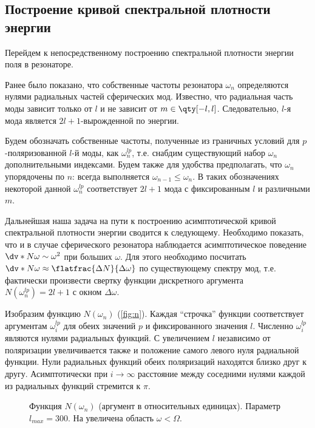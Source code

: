%
%
%
%
%
%

\subsection{Построение кривой спектральной плотности энергии}

    Перейдем к непосредственному построению спектральной плотности энергии поля в резонаторе.

    Ранее было показано, что собственные частоты резонатора $\omega_n$ определяются нулями радиальных частей сферических мод. Известно, что радиальная часть моды зависит только от $l$ и не зависит от $m \in \qty[-l,l]$. Следовательно, $l$-я мода является $2l + 1$-вырожденной по энергии.

    Будем обозначать собственные частоты, полученные из граничных условий для $p$-поляризованной $l$-й моды, как $\omega^{lp}_n$, т.е. снабдим существующий набор $\omega_n$ дополнительными индексами. Будем также для удобства предполагать, что $\omega_n$ упорядочены по $n$: всегда выполняется $\omega_{n-1} \le \omega_n$. В таких обозначениях некоторой данной $\omega^{lp}_n$ соответствует $2l + 1$ мода с фиксированным $l$ и различными $m$.

    Дальнейшая наша задача на пути к построению асимптотической кривой спектральной плотности энергии сводится к следующему. Необходимо показать, что и в случае сферического резонатора наблюдается асимптотическое поведение $\dv*{N}{\omega} \sim \omega^2$ при больших $\omega$. Для этого необходимо посчитать $\dv*{N}{\omega} \approx \flatfrac{\Delta N}{\Delta \omega}$ по существующему спектру мод, т.е. фактически произвести свертку функции дискретного аргумента $N(\omega^{lp}_n) = 2l + 1$ с окном $\Delta \omega$.

    Изобразим функцию $N(\omega_n)$ (\autoref{fig:n}). Каждая \enquote{строчка} функции соответствует аргументам $\omega^{lp}_i$ для обеих значений $p$ и фиксированного значения $l$. Численно $\omega^{lp}_i$ являются нулями радиальных функций. С увеличением $l$ независимо от поляризации увеличивается также и положение самого левого нуля радиальной функции. Нули радиальных функций обеих поляризаций находятся близко друг к другу. Асимптотически при $i \to \infty$ расстояние между соседними нулями каждой из радиальных функций стремится к $\pi$.
    \begin{figure}[h]
        \centering
        \subfloat[][]{%
            \label{fig:n_all}%
            \texttt{[image: n]}}%
        \hspace{8pt}%
        \hspace{8pt}%
        \caption[]{Функция $N(\omega_n)$ (аргумент в относительных единицах). Параметр $l_{max} = 300$. На  увеличена область $\omega < \Omega$. %
        } %
        \label{fig:n}%
    \end{figure}

